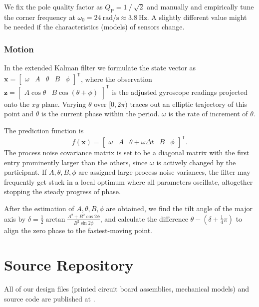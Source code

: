 \documentclass{nime-alternate} %
\begin{document}
We fix the pole quality factor as $Q_\mathrm{P} = 1 \mathbin{\mathop{/}} \sqrt{2}$ and manually and empirically tune the corner frequency at $\omega_0 = 24\ \text{rad/s} \approx 3.8\ \text{Hz}$. A slightly different value might be needed if the characteristics (models) of sensors change.

\subsubsection{Motion}
\label{appendix:est-motion}
In the extended Kalman filter we formulate the state vector as $\mathbf{x} = \begin{bmatrix} \omega & A & \theta & B & \phi \end{bmatrix}^\mathsf{T}$, where the observation $\mathbf{z} = \begin{bmatrix} A \cos \theta & B \cos (\theta + \phi) \end{bmatrix}^\mathsf{T}$ is the adjusted gyroscope readings projected onto the $xy$ plane. Varying $\theta$ over $[0, 2\pi)$ traces out an elliptic trajectory of this point and $\theta$ is the current phase within the period. $\omega$ is the rate of increment of $\theta$.

The prediction function is
\begin{equation}
f(\mathbf{x}) = \begin{bmatrix} \omega & A & \theta + \omega \Delta t & B & \phi \end{bmatrix}^\mathsf{T}\text{.}
\end{equation}
The process noise covariance matrix is set to be a diagonal matrix with the first entry prominently larger than the others, since $\omega$ is actively changed by the participant. If $A, \theta, B, \phi$ are assigned large process noise variances, the filter may frequently get stuck in a local optimum where all parameters oscillate, altogether stopping the steady progress of phase.

After the estimation of $A, \theta, B, \phi$ are obtained, we find the tilt angle of the major axis by $\delta = \frac 1 2 \mathop{\mathrm{arctan}} \frac {A^2 + B^2 \cos 2\phi} {B^2 \sin 2\phi}$, and calculate the difference $\theta - (\delta + \frac 1 4 \pi)$ to align the zero phase to the fastest-moving point.

\section{Source Repository}
All of our design files (printed circuit board assemblies, mechanical models) and source code are published at \newline {}.
\end{document}
